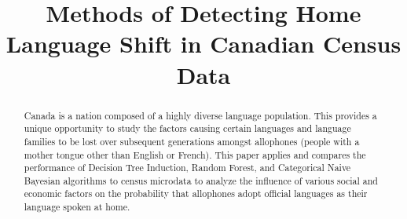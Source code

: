 \documentclass[10pt, conference, compsocconf]{IEEEtran}
\begin{document}
%
\title{Methods of Detecting Home Language Shift in Canadian Census Data}



\author{
}


% 








\maketitle


\begin{abstract}
Canada is a nation composed of a highly diverse language population. This provides a unique opportunity to study the factors causing certain languages and language families to be lost over subsequent generations amongst allophones (people with a mother tongue other than English or French). This paper applies and compares the performance of Decision Tree Induction, Random Forest, and Categorical Naive Bayesian algorithms to census microdata to analyze the influence of various social and economic factors on the probability that allophones adopt official languages as their language spoken at home.

\end{abstract}
\end{document}
